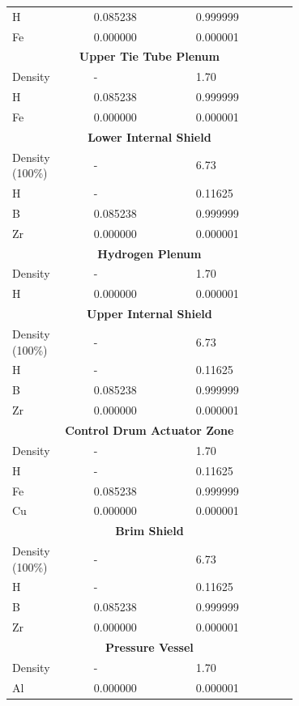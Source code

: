 \documentclass[8pt,a5paper]{article}
\begin{document}
\begin{longtable}{|m{0.2\linewidth}|m{0.25\linewidth}|m{0.25\linewidth}|}
    H & \SI{0.085238}{} & \SI{0.999999}{} \\
    Fe & \SI{0.000000}{} & \SI{0.000001}{} \\\hline
    \multicolumn{3}{|c|}{\textbf{Upper Tie Tube Plenum}}\\\hline
    Density & - & \SI{1.70}{} \\
    H & \SI{0.085238}{} & \SI{0.999999}{} \\
    Fe & \SI{0.000000}{} & \SI{0.000001}{} \\\hline
    \multicolumn{3}{|c|}{\textbf{Lower Internal Shield}}\\\hline
    Density (100\%) & - & \SI{6.73}{} \\
    H & - & \SI{0.11625}{} \\
    B & \SI{0.085238}{} & \SI{0.999999}{} \\
    Zr & \SI{0.000000}{} & \SI{0.000001}{} \\\hline
    \multicolumn{3}{|c|}{\textbf{Hydrogen Plenum}}\\\hline
    Density & - & \SI{1.70}{} \\
    H & \SI{0.000000}{} & \SI{0.000001}{} \\\hline
    \multicolumn{3}{|c|}{\textbf{Upper Internal Shield}}\\\hline
    Density (100\%) & - & \SI{6.73}{} \\
    H & - & \SI{0.11625}{} \\
    B & \SI{0.085238}{} & \SI{0.999999}{} \\
    Zr & \SI{0.000000}{} & \SI{0.000001}{} \\\hline
    \multicolumn{3}{|c|}{\textbf{Control Drum Actuator Zone}}\\\hline
    Density & - & \SI{1.70}{} \\
    H & - & \SI{0.11625}{} \\
    Fe & \SI{0.085238}{} & \SI{0.999999}{} \\
    Cu & \SI{0.000000}{} & \SI{0.000001}{} \\\hline
    \multicolumn{3}{|c|}{\textbf{Brim Shield}}\\\hline
    Density (100\%) & - & \SI{6.73}{} \\
    H & - & \SI{0.11625}{} \\
    B & \SI{0.085238}{} & \SI{0.999999}{} \\
    Zr & \SI{0.000000}{} & \SI{0.000001}{} \\\hline
    \multicolumn{3}{|c|}{\textbf{Pressure Vessel}}\\\hline
    Density & - & \SI{1.70}{} \\
    Al & \SI{0.000000}{} & \SI{0.000001}{} \\
\end{longtable}
\end{document}
